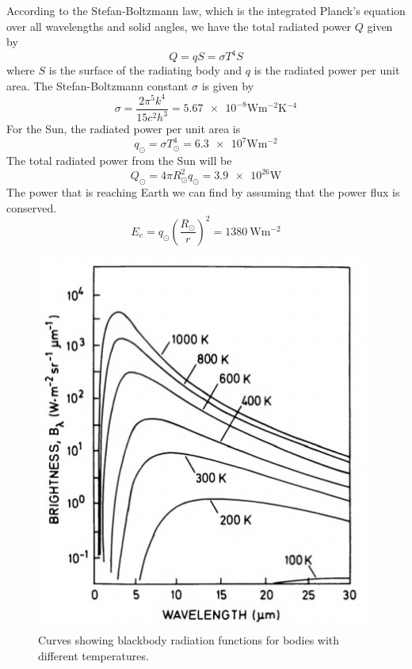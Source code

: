 According to the Stefan-Boltzmann law, which is the integrated Planck's equation over all wavelengths and solid angles, we have the total radiated power \(Q\) given by
\begin{equation}\label{eq:L9_stefan_boltzmann}
    Q=qS=\sigma T^4S
\end{equation}
where \(S\) is the surface of the radiating body and \(q\) is the radiated power per unit area. The Stefan-Boltzmann constant \(\sigma \) is given by
\begin{equation*}
    \sigma=\frac{2\pi^5k^4}{15c^2h^3}=\num{5.67e-8}\si{\watt\metre^{-2}\kelvin^{-4}}
\end{equation*}
For the Sun, the radiated power per unit area is
\begin{equation*}
    q_\odot=\sigma T_\odot^4=\num{6.3e7}\si{\watt\metre^{-2}}
\end{equation*}
The total radiated power from the Sun will be
\begin{equation*}
    Q_\odot=4\pi R_\odot^2q_\odot=\num{3.9e26}\si{\watt}
\end{equation*}
The power that is reaching Earth we can find by assuming that the power flux is conserved.
\begin{equation*}
    E_e=q_\odot{\left(\frac{R_\odot}{r}\right)}^2=\SI{1380}{\watt\metre^{-2}}
\end{equation*}
\begin{figure}[t]
    \centering
    \includegraphics[width=.4\linewidth]{bilder/L9_blackbody_radiation.png}
    \caption{Curves showing blackbody radiation functions for bodies with different temperatures.}\label{fig:L9_blackbody_radiation}
\end{figure}

